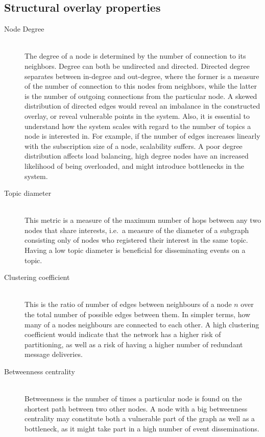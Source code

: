 \subsection{Structural overlay properties}
\begin{description}
\item[Node Degree]\hfill\\

The degree of a node is determined by the number of connection to its
neighbors. Degree can both be undirected and directed. Directed degree
separates between in-degree and out-degree, where the former is a
measure of the number of connection to this nodes from neighbors, while
the latter is the number of outgoing connections from the particular
node. A skewed distribution of directed edges would reveal an imbalance
in the constructed overlay, or reveal vulnerable points in the system.
Also, it is essential to understand how the system scales with regard to
the number of topics a node is interested in. For example, if the number
of edges increases linearly with the subscription size of a node,
scalability suffers. A poor degree distribution affects load balancing,
high degree nodes have an increased likelihood of being overloaded, and
might introduce bottlenecks in the system.

\item[Topic diameter]\hfill\\

This metric is a measure of the maximum number of hops between any two nodes that
share interests, i.e.\ a measure of the diameter of a subgraph
consisting only of nodes who registered their interest in the
same topic. Having a low topic diameter is beneficial for
disseminating events on a topic.

\item[Clustering coefficient]\hfill\\

This is the ratio of number of edges between neighbours of a node $n$
over the total number of possible edges between them. In simpler terms,
how many of a nodes neighbours are connected to each other. A high
clustering coefficient would indicate that the network has a higher risk
of partitioning, as well as a risk of having a higher number of
redundant message deliveries.

\item[Betweenness centrality]\hfill\\

Betweenness is the number of times a particular node is found on the
shortest path between two other nodes. A node with a big betweenness
centrality may constitute both a vulnerable part of the graph as well as
a bottleneck, as it might take part in a high number of event
disseminations.


\end{description}
